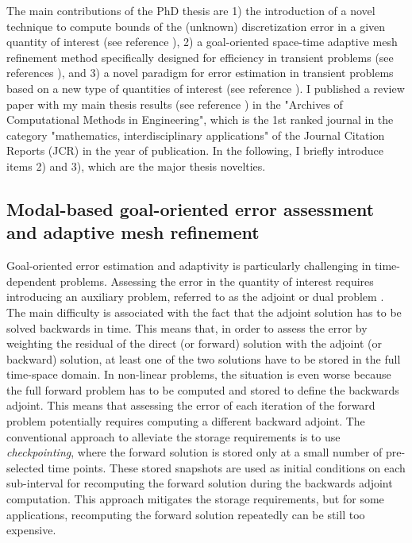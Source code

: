 \documentclass{article}
\newcommand{\bemph}[1]{#1}
\begin{document}
The main contributions of the PhD thesis are 1) the introduction of a novel technique to compute bounds of the (unknown) discretization error in a given quantity of interest (see reference \cite{verdugo_computable_2012}), 2) a goal-oriented space-time adaptive mesh refinement method specifically designed for efficiency in transient problems (see references \cite{casadei_algorithm_2013,VerdugoParesDiez2014a}), and 3)  a novel paradigm for error estimation in transient problems based on a new type of quantities of interest (see reference \cite{Verdugo2013}). I published a review paper with my main thesis results (see reference \cite{verdugo_error_2014}) in the "Archives of Computational Methods in Engineering", which is the \bemph{1st ranked journal} in the category "mathematics, interdisciplinary applications" of the Journal Citation Reports (JCR) in the year of publication. In the following, I briefly introduce items 2) and 3), which are the major thesis novelties.

\subsection{Modal-based goal-oriented error assessment and adaptive mesh refinement}

Goal-oriented error estimation and adaptivity is particularly challenging in time-dependent problems. Assessing the error in the quantity of interest requires introducing an auxiliary problem, referred to as the adjoint or dual problem \cite{becker_optimal_2001}. The main difficulty is associated with the fact that the adjoint solution has to be solved backwards in time. This means that, in order to assess the error by weighting the residual of the direct (or forward) solution with the adjoint (or backward) solution, at least one of the two solutions have to be stored in the full time-space domain. In non-linear problems, the situation is even worse because the full forward problem has to be computed and stored to define the backwards adjoint. This means that assessing the error of each iteration of the forward problem potentially requires computing a different backward adjoint. The conventional approach to alleviate the storage requirements is to use \emph{checkpointing}, where the forward solution is stored only at a small number of pre-selected time points. These stored snapshots are used  as initial conditions on each sub-interval for recomputing the forward solution during the backwards adjoint computation. This approach mitigates the storage requirements, but for some applications, recomputing the forward solution repeatedly can be still too expensive.
\end{document}
